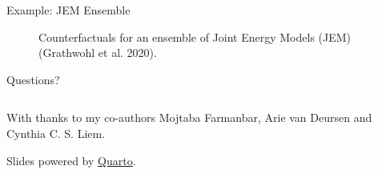 \documentclass[
  ignorenonframetext,
]{beamer}
\theoremstyle{definition}
\theoremstyle{remark}
\begin{document}
\begin{frame}{Example: JEM Ensemble}
\label{example-jem-ensemble}
\begin{figure}


\caption{\label{fig-mnist-jem}Counterfactuals for an ensemble of Joint
Energy Models (JEM) (Grathwohl et al. 2020).}

\end{figure}%
\end{frame}

\begin{frame}{Questions?}
\label{questions}
\begin{columns}[T]
\begin{column}{0.5\textwidth}
With thanks to my co-authors Mojtaba Farmanbar, Arie van Deursen and
Cynthia C. S. Liem.

Slides powered by \href{https://quarto.org/}{Quarto}.
\end{column}

\begin{column}{0.5\textwidth}
\end{column}
\end{columns}
\end{frame}
\end{document}
